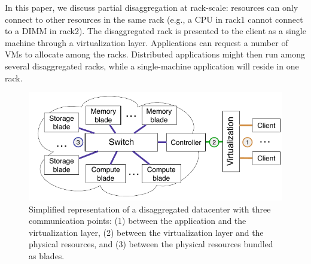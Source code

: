 In this paper, we discuss partial disaggregation at rack-scale:
resources can only connect to other resources in the same rack (e.g., a CPU in
rack1 cannot connect to a DIMM in rack2).
The disaggregated rack is presented to the
client as a single machine through a virtualization layer. Applications can
request a number of VMs to allocate among the racks.
Distributed applications might then run among several disaggregated racks, while
a single-machine application will reside in one rack. %


\begin{figure}
    \centering
    \includegraphics[width=\columnwidth]{fig/ddc-overview}
    \caption{Simplified representation of a disaggregated datacenter with
    three communication points: (1) between the application and the
    virtualization layer,
    (2) between the virtualization layer and the physical resources, and (3)
    between the physical resources bundled as blades.}
    \label{fig:DDC}
\end{figure}





